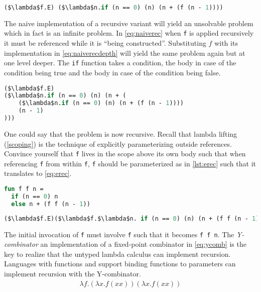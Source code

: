 \begin{lstlisting}[language=ML,caption={Recursive function},label={eq:naiverec},mathescape=true]
($\lambda$f.E) ($\lambda$n.if (n == 0) (n) (n + (f (n - 1))))
\end{lstlisting}
The naive implementation of a recursive variant will yield an unsolvable problem which in fact is an infinite problem.
In \autoref{eq:naiverec} when \texttt{f} is applied recursively it must be referenced while it is ``being constructed''.
Substituting $f$ with its implementation in \autoref{eq:naiverecdepth} will yield the same problem again but at one level deeper.
The \texttt{if} function takes a condition, the body in case of the condition being true and the body in case of the condition being false.
\begin{lstlisting}[language=ML,caption={Recursive function f substituted},label={eq:naiverecdepth},mathescape=true]
($\lambda$f.E) 
($\lambda$n.if (n == 0) (n) (n + (
    ($\lambda$n.if (n == 0) (n) (n + (f (n - 1))))
    (n - 1)
)))
\end{lstlisting}
One could say that the problem is now recursive.
Recall that lambda lifting (\autoref{scoping}) is the technique of explicitly parameterizing outside references.
Convince yourself that \texttt{f} lives in the scope above its own body such that when referencing \texttt{f} from within \texttt{f}, \texttt{f} should be parameterized as in \autoref{lst:erec} such that it translates to \autoref{eq:erec}.
\begin{lstlisting}[language=ML,caption={Explicitly passing recursive function},label={lst:erec}]
fun f f n = 
  if (n == 0) n
  else n + (f f (n - 1))
\end{lstlisting}
\begin{lstlisting}[language=ML,caption={Explicitly passing recursive function in the lambda calculus},label={eq:erec},mathescape=true]
($\lambda$f.E)($\lambda$f.$\lambda$n. if (n == 0) (n) (n + (f f (n - 1))))
\end{lstlisting}
The initial invocation of \texttt{f} must involve \texttt{f} such that it becomes \texttt{f f n}.
The \textit{Y-combinator} an implementation of a fixed-point combinator in \autoref{eq:ycomb} is the key to realize that the untyped lambda calculus can implement recursion.
Languages with functions and support binding functions to parameters can implement recursion with the Y-combinator.
\begin{align}
    \lambda f . (\lambda x . f (x x)) (\lambda x . f (x x))
    \label{eq:ycomb}
\end{align}

